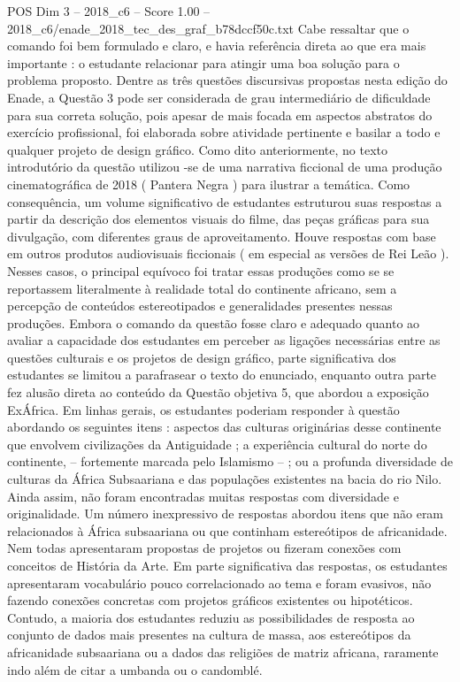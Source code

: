 \begin{textsample}{POS Dim 3 – 2018\_c6 – Score 1.00 – 2018\_c6/enade\_2018\_tec\_des\_graf\_b78dccf50c.txt}
Cabe ressaltar que o comando foi bem formulado e claro, e havia referência direta ao que era mais importante : o estudante relacionar para atingir uma boa solução para o problema proposto.
Dentre as três questões discursivas propostas nesta edição do Enade, a Questão 3 pode ser considerada de grau intermediário de dificuldade para sua correta solução, pois apesar de mais focada em aspectos abstratos do exercício profissional, foi elaborada sobre atividade pertinente e basilar a todo e qualquer projeto de design gráfico.
Como dito anteriormente, no texto introdutório da questão utilizou -se de uma narrativa ficcional de uma produção cinematográfica de 2018 ( Pantera Negra ) para ilustrar a temática.
Como consequência, um volume significativo de estudantes estruturou suas respostas a partir da descrição dos elementos visuais do filme, das peças gráficas para sua divulgação, com diferentes graus de aproveitamento.
Houve respostas com base em outros produtos audiovisuais ficcionais ( em especial as versões de Rei Leão ).
Nesses casos, o principal equívoco foi tratar essas produções como se se reportassem literalmente à realidade total do continente africano, sem a percepção de conteúdos estereotipados e generalidades presentes nessas produções.
Embora o comando da questão fosse claro e adequado quanto ao avaliar a capacidade dos estudantes em perceber as ligações necessárias entre as questões culturais e os projetos de design gráfico, parte significativa dos estudantes se limitou a parafrasear o texto do enunciado, enquanto outra parte fez alusão direta ao conteúdo da Questão objetiva 5, que abordou a exposição ExÁfrica.
Em linhas gerais, os estudantes poderiam responder à questão abordando os seguintes itens : aspectos das culturas originárias desse continente que envolvem civilizações da Antiguidade ; a experiência cultural do norte do continente, – fortemente marcada pelo Islamismo – ; ou a profunda diversidade de culturas da África Subsaariana e das populações existentes na bacia do rio Nilo.
Ainda assim, não foram encontradas muitas respostas com diversidade e originalidade.
Um número inexpressivo de respostas abordou itens que não eram relacionados à África subsaariana ou que continham estereótipos de africanidade.
Nem todas apresentaram propostas de projetos ou fizeram conexões com conceitos de História da Arte.
Em parte significativa das respostas, os estudantes apresentaram vocabulário pouco correlacionado ao tema e foram evasivos, não fazendo conexões concretas com projetos gráficos existentes ou hipotéticos.
Contudo, a maioria dos estudantes reduziu as possibilidades de resposta ao conjunto de dados mais presentes na cultura de massa, aos estereótipos da africanidade subsaariana ou a dados das religiões de matriz africana, raramente indo além de citar a umbanda ou o candomblé.

\end{textsample}
